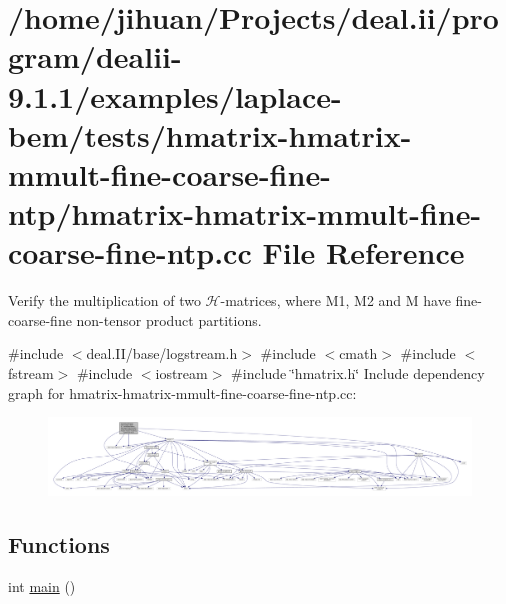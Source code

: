 \hypertarget{hmatrix-hmatrix-mmult-fine-coarse-fine-ntp_8cc}{}\section{/home/jihuan/\+Projects/deal.ii/program/dealii-\/9.1.1/examples/laplace-\/bem/tests/hmatrix-\/hmatrix-\/mmult-\/fine-\/coarse-\/fine-\/ntp/hmatrix-\/hmatrix-\/mmult-\/fine-\/coarse-\/fine-\/ntp.cc File Reference}
\label{hmatrix-hmatrix-mmult-fine-coarse-fine-ntp_8cc}


Verify the multiplication of two $\mathcal{H}$-\/matrices, where M1, M2 and M have fine-\/coarse-\/fine non-\/tensor product partitions.  


{\ttfamily \#include $<$deal.\+I\+I/base/logstream.\+h$>$}\newline
{\ttfamily \#include $<$cmath$>$}\newline
{\ttfamily \#include $<$fstream$>$}\newline
{\ttfamily \#include $<$iostream$>$}\newline
{\ttfamily \#include \char`\"{}hmatrix.\+h\char`\"{}}\newline
Include dependency graph for hmatrix-\/hmatrix-\/mmult-\/fine-\/coarse-\/fine-\/ntp.cc\+:
\nopagebreak
\begin{figure}[H]
\begin{center}
\leavevmode
\includegraphics[width=350pt]{hmatrix-hmatrix-mmult-fine-coarse-fine-ntp_8cc__incl}
\end{center}
\end{figure}
\subsection*{Functions}
\begin{DoxyCompactItemize}
\item 
int \hyperlink{hmatrix-hmatrix-mmult-fine-coarse-fine-ntp_8cc_ae66f6b31b5ad750f1fe042a706a4e3d4}{main} ()
\end{DoxyCompactItemize}


